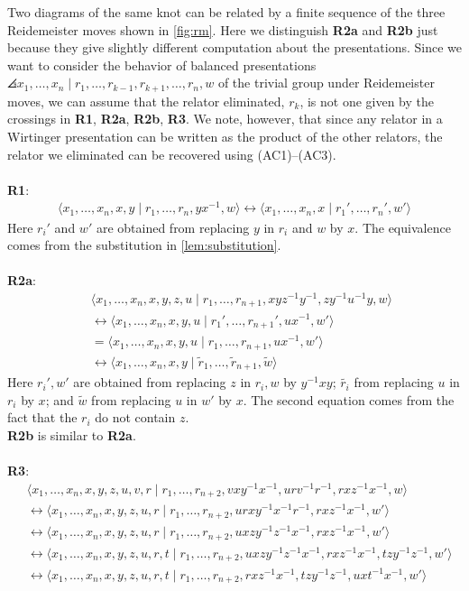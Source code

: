 Two diagrams of the same knot can be related by a finite sequence of the three
Reidemeister moves shown in \cref{fig:rm}. Here we distinguish \textbf{R2a} and \textbf{R2b} just because they give slightly different computation about the presentations. Since we want to consider the behavior of balanced presentations $\angles{ x_1,\ldots, x_n \mid  r_1,\ldots, r_{k-1}, r_{k+1},\ldots, r_n, w}$ of the trivial group under Reidemeister moves, we can assume that the relator eliminated, $r_k$, is not one given by the crossings in \textbf{R1}, \textbf{R2a}, \textbf{R2b}, \textbf{R3}. We note, however, that since any relator in a Wirtinger presentation can be written as the product of the other relators, the relator we eliminated can be recovered using (AC1)--(AC3).
\\
\\
\textbf{R1}:
\begin{align*}
\langle x_1,\ldots,x_n,x,y\mid r_1,\ldots,r_n,yx^{-1},w\rangle\longleftrightarrow\langle x_1,\ldots,x_n,x\mid r_1',\ldots,r_n',w'\rangle
\end{align*}
Here $r_i'$ and $w'$ are obtained from replacing $y$ in $r_i$ and $w$ by $x$. The equivalence comes from the substitution in \cref{lem:substitution}.
\\
\\
\textbf{R2a}:
\begin{align*}
\,\,&\langle x_1,\ldots,x_n,x,y,z,u\mid r_1,\ldots,r_{n+1},xyz^{-1}y^{-1},zy^{-1}u^{-1}y,w\rangle
\\
&\longleftrightarrow\langle x_1,\ldots,x_n,x,y,u\mid r_1',\ldots,r_{n+1}',ux^{-1},w'\rangle
\\
&=\langle x_1,\ldots,x_n,x,y,u\mid r_1,\ldots,r_{n+1},ux^{-1},w'\rangle
\\
&\longleftrightarrow\langle x_1,\ldots,x_n,x,y\mid \tilde{r}_1,\ldots,\tilde{r}_{n+1},\tilde{w}\rangle
\end{align*}
Here $r_i',w'$ are obtained from replacing $z$ in $r_i,w$ by $y^{-1}xy$; $\tilde{r_i}$ from replacing $u$ in $r_i$ by $x$; and $\tilde{w}$ from replacing $u$ in $w'$ by $x$. The second equation comes from the fact that the $r_i$ do not contain $z$.
\\
\textbf{R2b} is similar to \textbf{R2a}.
\\
\\
\textbf{R3}:
\begin{align*}
&\langle x_1,\ldots,x_n,x,y,z,u,v,r\mid r_1,\ldots,r_{n+2},vxy^{-1}x^{-1},urv^{-1}r^{-1},rxz^{-1}x^{-1},w\rangle
\\
&\longleftrightarrow\langle x_1,\ldots,x_n,x,y,z,u,r\mid r_1,\ldots,r_{n+2},urxy^{-1}x^{-1}r^{-1},rxz^{-1}x^{-1},w'\rangle
\\
&\longleftrightarrow\langle x_1,\ldots,x_n,x,y,z,u,r\mid r_1,\ldots,r_{n+2},uxzy^{-1}z^{-1}x^{-1},rxz^{-1}x^{-1},w'\rangle
\\
&\longleftrightarrow\langle x_1,\ldots,x_n,x,y,z,u,r,t\mid r_1,\ldots,r_{n+2},uxzy^{-1}z^{-1}x^{-1},rxz^{-1}x^{-1},tzy^{-1}z^{-1},w'\rangle
\\
&\longleftrightarrow\langle x_1,\ldots,x_n,x,y,z,u,r,t\mid r_1,\ldots,r_{n+2},rxz^{-1}x^{-1},tzy^{-1}z^{-1},uxt^{-1}x^{-1},w'\rangle
\end{align*}
